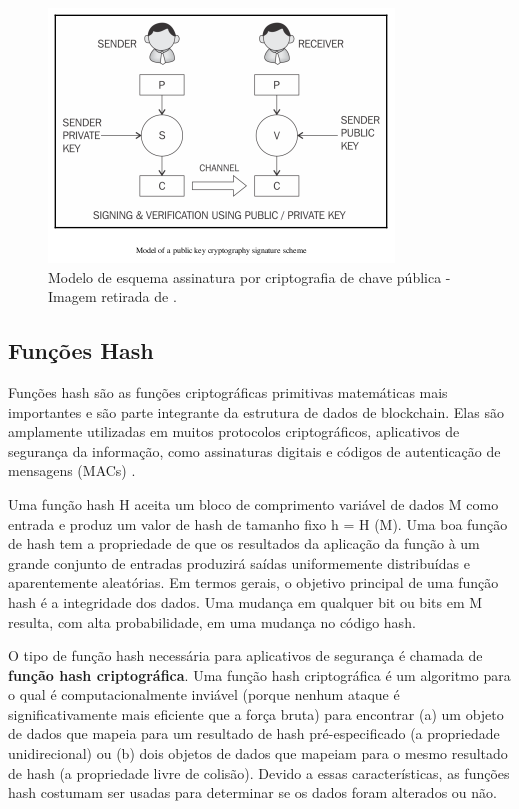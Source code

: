                     \begin{figure}[H]
                         \centering
                         \includegraphics[scale=0.7]{figuras/capitulo_2/public_private_signature.png}
                         \caption{Modelo de esquema assinatura por criptografia de chave pública - Imagem retirada de \cite{mastering_blockchain}.}
                         \label{fig:public_private_signature}
                    \end{figure}
                    
    \subsection{Funções Hash}
        
        Funções hash são as funções criptográficas primitivas matemáticas mais importantes e são parte integrante da estrutura de dados de blockchain. Elas são amplamente utilizadas em muitos protocolos criptográficos, aplicativos de segurança da informação, como assinaturas digitais e códigos de autenticação de mensagens (MACs) \cite{beginnig_blockchain_bikramaditya}.
        
        Uma função hash H aceita um bloco de comprimento variável de dados M como entrada e produz um valor de hash de tamanho fixo h = H (M). Uma boa função de hash tem a propriedade de que os resultados da aplicação da função à um grande conjunto de entradas produzirá saídas uniformemente distribuídas e aparentemente aleatórias. Em termos gerais, o objetivo principal de uma função hash é a integridade dos dados. Uma mudança em qualquer bit ou bits em M resulta, com alta probabilidade, em uma mudança no código hash.\cite{cryptograpy_and_network_stallings}
        
        O tipo de função hash necessária para aplicativos de segurança é chamada de \textbf{função hash criptográfica}. Uma função hash criptográfica é um algoritmo para o qual é computacionalmente inviável (porque nenhum ataque é significativamente mais eficiente que a força bruta) para encontrar (a) um objeto de dados que mapeia para um resultado de hash pré-especificado (a propriedade unidirecional) ou (b) dois objetos de dados que mapeiam para o mesmo resultado de hash (a propriedade livre de colisão). Devido a essas características, as funções hash costumam ser usadas para determinar se os dados foram alterados ou não.\cite{cryptograpy_and_network_stallings}

